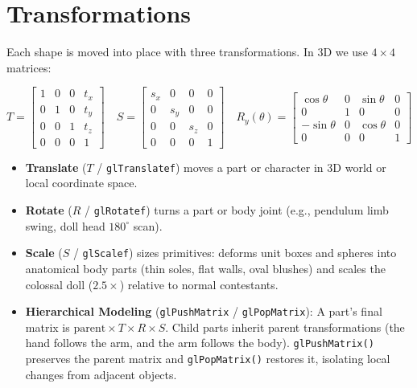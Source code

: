 \documentclass[11pt,a4paper]{article}
\begin{document}
\clearpage
\section{Transformations}\label{sec:transform}
Each shape is moved into place with three transformations. In 3D we use $4\times4$ matrices:

\[
T=\begin{bmatrix}1&0&0&t_x\\0&1&0&t_y\\0&0&1&t_z\\0&0&0&1\end{bmatrix}\quad
S=\begin{bmatrix}s_x&0&0&0\\0&s_y&0&0\\0&0&s_z&0\\0&0&0&1\end{bmatrix}\quad
R_y(\theta)=\begin{bmatrix}\cos\theta&0&\sin\theta&0\\0&1&0&0\\-\sin\theta&0&\cos\theta&0\\0&0&0&1\end{bmatrix}
\]

\begin{itemize}
  \item \textbf{Translate} ($T$ / \texttt{glTranslatef}) moves a part or character in 3D world or local coordinate space.
  \item \textbf{Rotate} ($R$ / \texttt{glRotatef}) turns a part or body joint (e.g., pendulum limb swing, doll head $180^\circ$ scan).
  \item \textbf{Scale} ($S$ / \texttt{glScalef}) sizes primitives: deforms unit boxes and spheres into anatomical body parts (thin soles, flat walls, oval blushes) and scales the colossal doll ($2.5\times$) relative to normal contestants.
  \item \textbf{Hierarchical Modeling} (\texttt{glPushMatrix} / \texttt{glPopMatrix}): A part's final matrix is $\text{parent} \times T \times R \times S$. Child parts inherit parent transformations (the hand follows the arm, and the arm follows the body). \texttt{glPushMatrix()} preserves the parent matrix and \texttt{glPopMatrix()} restores it, isolating local changes from adjacent objects.
\end{itemize}
\end{document}
